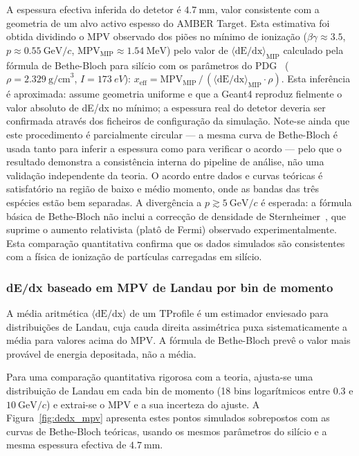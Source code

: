\documentclass[12pt,a4paper]{article}
\begin{document}
A espessura efectiva inferida do detetor é $4.7~\text{mm}$, valor consistente
com a geometria de um alvo activo espesso do AMBER Target. Esta estimativa foi
obtida dividindo o MPV observado dos piões no mínimo de ionização
($\beta\gamma \approx 3.5$, $p \approx 0.55~\text{GeV}/c$,
$\text{MPV}_\text{MIP} \approx 1.54~\text{MeV}$) pelo valor de
$\langle\text{dE/dx}\rangle_\text{MIP}$ calculado pela fórmula de Bethe-Bloch
para silício com os parâmetros do PDG~\cite{pdg2022}
($\rho = 2.329~\text{g/cm}^3$, $I = \SI{173}{eV}$):
$x_\text{eff} = \text{MPV}_\text{MIP}\, /\, (\langle\text{dE/dx}\rangle_\text{MIP} \cdot \rho)$.
Esta inferência é aproximada: assume geometria uniforme e que a Geant4 reproduz
fielmente o valor absoluto de dE/dx no mínimo; a espessura real do detetor
deveria ser confirmada através dos ficheiros de configuração da simulação.
Note-se ainda que este procedimento é parcialmente circular — a mesma curva de
Bethe-Bloch é usada tanto para inferir a espessura como para verificar o acordo
— pelo que o resultado demonstra a consistência interna do pipeline de análise,
não uma validação independente da teoria.
O acordo entre dados e curvas teóricas é satisfatório na região de baixo e médio momento, onde as
bandas das três espécies estão bem separadas. A divergência a $p \gtrsim 5~\text{GeV}/c$
é esperada: a fórmula básica de Bethe-Bloch não inclui a correcção de densidade
de Sternheimer~\cite{sternheimer1982}, que suprime o aumento relativista (platô
de Fermi) observado experimentalmente. Esta comparação quantitativa confirma que os dados simulados
são consistentes com a física de ionização de partículas carregadas em silício.

\subsubsection{dE/dx baseado em MPV de Landau por bin de momento}
\label{sec:dedx_mpv}

A média aritmética $\langle\text{dE/dx}\rangle$ de um TProfile é um estimador
enviesado para distribuições de Landau, cuja cauda direita assimétrica puxa
sistematicamente a média para valores acima do MPV. A fórmula de Bethe-Bloch
prevê o valor mais provável de energia depositada, não a média.

Para uma comparação quantitativa rigorosa com a teoria, ajusta-se uma
distribuição de Landau em cada bin de momento (18 bins logarítmicos entre
$0.3$ e $10~\text{GeV}/c$) e extrai-se o MPV e a sua incerteza do ajuste.
A Figura~\ref{fig:dedx_mpv} apresenta estes pontos simulados sobrepostos
com as curvas de Bethe-Bloch teóricas, usando os mesmos parâmetros do silício
e a mesma espessura efectiva de $4.7~\text{mm}$.
\end{document}
